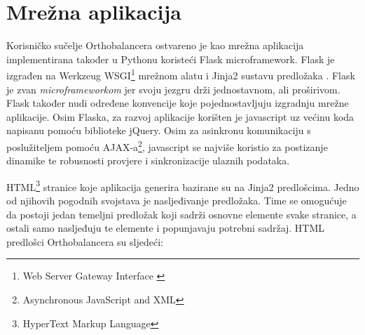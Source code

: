 \chapter{Mrežna aplikacija}
\label{chap:server}

\begin{sloppypar}
Korisničko sučelje Orthobalancera ostvareno je kao mrežna aplikacija
implementirana također u Pythonu koristeći Flask microframework. Flask je
izgrađen na Werkzeug WSGI\footnote{Web Server Gateway Interface \cite{pep333}}
mrežnom alatu i Jinja2 sustavu predložaka . Flask je zvan
\emph{microframeworkom} jer svoju jezgru drži jednostavnom, ali proširivom.
Flask također nudi određene konvencije koje pojednostavljuju izgradnju mrežne
aplikacije. Osim Flaska, za razvoj aplikacije korišten je javascript uz većinu
koda napisanu pomoću biblioteke jQuery. Osim za asinkronu komunikaciju s
poslužiteljem pomoću AJAX-a\footnote{Asynchronous JavaScript and XML},
javascript se najviše koristio za postizanje dinamike te robusnosti provjere i
sinkronizacije ulaznih podataka.

\end{sloppypar}

HTML\footnote{HyperText Markup Language} stranice koje aplikacija generira
bazirane su na Jinja2 predlošcima. Jedno od njihovih pogodnih svojstava je
nasljeđivanje predložaka. Time se omogućuje da postoji jedan temeljni predložak
koji sadrži osnovne elemente svake stranice, a ostali samo nasljeđuju te
elemente i popunjavaju potrebni sadržaj. HTML predlošci Orthobalancera su
sljedeći:

